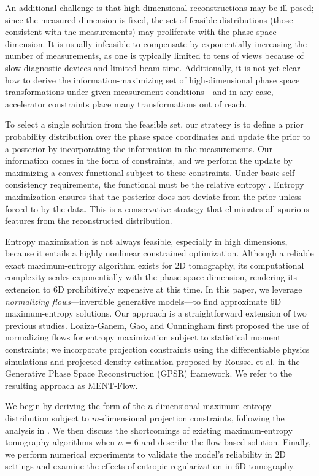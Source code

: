 \documentclass[%
    reprint,
    twocolumn,
    nofootinbib,
    amsmath,
    amssymb,
    aps,
    prstab,
]{revtex4-2}
\begin{document}
An additional challenge is that high-dimensional reconstructions may be ill-posed; since the measured dimension is fixed, the set of feasible distributions (those consistent with the measurements) may proliferate with the phase space dimension. It is usually infeasible to compensate by exponentially increasing the number of measurements, as one is typically limited to tens of views because of slow diagnostic devices and limited beam time. Additionally, it is not yet clear how to derive the information-maximizing set of high-dimensional phase space transformations under given measurement conditions---and in any case, accelerator constraints place many transformations out of reach. 

To select a single solution from the feasible set, our strategy is to define a prior probability distribution over the phase space coordinates and update the prior to a posterior by incorporating the information in the measurements. Our information comes in the form of constraints, and we perform the update by maximizing a convex functional subject to these constraints. Under basic self-consistency requirements, the functional must be the relative entropy \cite{Presse_2013, Skilling_1991, Jaynes_2012, Giffin_2008}. Entropy maximization ensures that the posterior does not deviate from the prior unless forced to by the data. This is a conservative strategy that eliminates all spurious features from the reconstructed distribution.

Entropy maximization is not always feasible, especially in high dimensions, because it entails a highly nonlinear constrained optimization. Although a reliable exact maximum-entropy algorithm exists for 2D tomography, its computational complexity scales exponentially with the phase space dimension, rendering its extension to 6D prohibitively expensive at this time. In this paper, we leverage \textit{normalizing flows}---invertible generative models---to find approximate 6D maximum-entropy solutions. Our approach is a straightforward extension of two previous studies. Loaiza-Ganem, Gao, and Cunningham \cite{Loaiza_2016} first proposed the use of normalizing flows for entropy maximization subject to statistical moment constraints; we incorporate projection constraints using the differentiable physics simulations and projected density estimation proposed by Roussel et al. \cite{Roussel_2023} in the Generative Phase Space Reconstruction (GPSR) framework. We refer to the resulting approach as MENT-Flow.

We begin by deriving the form of the $n$-dimensional maximum-entropy distribution subject to $m$-dimensional projection constraints, following the analysis in \cite{Wong_2022}. We then discuss the shortcomings of existing maximum-entropy tomography algorithms when $n = 6$ and describe the flow-based solution. Finally, we perform numerical experiments to validate the model's reliability in 2D settings and examine the effects of entropic regularization in 6D tomography.
\end{document}
